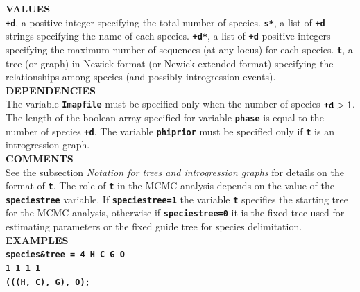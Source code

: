 \documentclass[a4paper]{book}
\numberwithin{equation}{section} \renewcommand{\baselinestretch}{0.55}
\begin{document}
\textbf{VALUES} \vspace{5pt}\\
\textbf{\texttt{+d}}, a positive integer specifying the total number of species. \textbf{\texttt{s*}}, a list of \textbf{\texttt{+d}} strings specifying the name of each species. \textbf{\texttt{+d*}}, a list of \textbf{\texttt{+d}} positive integers specifying the maximum number of sequences (at any locus) for each species. \textbf{\texttt{t}}, a tree (or graph) in Newick format (or Newick extended format) specifying the relationships among species (and possibly introgression events). \vspace{5pt}\\
\textbf{DEPENDENCIES} \vspace{5pt}\\
The variable \textbf{\texttt{Imapfile}} must be specified only when
the number of species $\textbf{\texttt{+d}} > 1$. The length of the
boolean array specified for variable \textbf{\texttt{phase}} is equal
to the number of species \textbf{\texttt{+d}}. The variable
\textbf{\texttt{phiprior}} must be specified only if
\textbf{\texttt{t}} is an introgression graph.
\vspace{5pt}\\
\textbf{COMMENTS} \vspace{5pt}\\
See the subsection \emph{Notation for trees and introgression graphs}
for details on the format of \textbf{\texttt{t}}. The role of
\textbf{\texttt{t}} in the MCMC analysis depends on the value of the
\textbf{\texttt{speciestree}} variable. If
\textbf{\texttt{speciestree=1}} the variable \textbf{\texttt{t}}
specifies the starting tree for the MCMC analysis, otherwise if
\textbf{\texttt{speciestree=0}} it is the fixed tree used for
estimating parameters or the fixed guide tree for species
delimitation.
\vspace{5pt}\\
\textbf{EXAMPLES} \vspace{5pt}\\
\textbf{\texttt{species\&tree = 4  H  C  G  O}} \vspace{2pt}\\
\hspace*{7.2pc}  \textbf{\texttt{1  1  1  1}} \vspace{2pt}\\
\hspace*{7.2pc}  \textbf{\texttt{(((H, C), G), O);}} \vspace{10pt}\\
\end{document}
